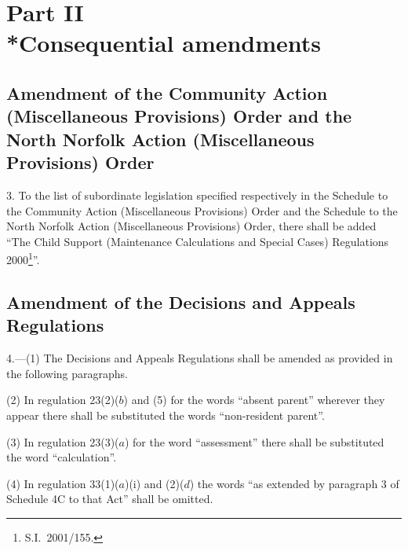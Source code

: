 \documentclass[12pt,a4paper]{article}
\begin{document}
\section[Part II --- Consequential amendments]{Part II\\*Consequential amendments}

\renewcommand\parthead{--- Part II}

\subsection[3. Amendment of the Community Action (Miscellaneous Provisions) Order and the North Norfolk Action (Miscellaneous Provisions) Order]{\sloppy Amendment of the Community Action (Miscellaneous Provisions) Order and the North Norfolk Action (Miscellaneous Provisions) Order}

3.  To the list of subordinate legislation specified respectively in the Schedule to the Community Action (Miscellaneous Provisions) Order and the Schedule to the North Norfolk Action (Miscellaneous Provisions) Order, there shall be added “The Child Support (Maintenance Calculations and Special Cases) Regulations 2000\footnote{S.I.\ 2001/155.}”.

\subsection[4. Amendment of the Decisions and Appeals Regulations]{Amendment of the Decisions and Appeals Regulations}

4.---(1)  The Decisions and Appeals Regulations shall be amended as provided in the following paragraphs.

(2) In regulation%
{} 23(2)($b$)  and (5) 
for the words “absent parent” wherever they appear there shall be substituted the words “non-resident parent”.

(3) In regulation 23(3)($a$)  for the word “assessment” there shall be substituted the word “calculation”.

(4) In regulation 33(1)($a$)(i) and (2)($d$)  the words “as extended by paragraph 3 of Schedule 4C to that Act” shall be omitted.

\end{document}
